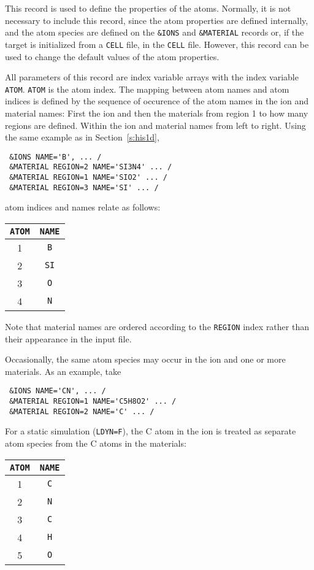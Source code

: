 This record is used to define the properties of the atoms. Normally, it is not
necessary to include this record, since the atom properties are defined
internally, and the atom species are defined on the \texttt{\&IONS} and
\texttt{\&MATERIAL} records or, if the target is initialized from a
\texttt{CELL} file, in the \texttt{CELL} file. However, this record can be used
to change the default values of the atom properties.

All parameters of this record are index variable arrays with the index variable
\texttt{ATOM}. \texttt{ATOM} is the atom index. The mapping between atom names
and atom indices is defined by the sequence of occurence of the atom names in
the ion and material names: First the ion and then the materials from region 1
to how many regions are defined. Within the ion and material names from left to
right. Using the same example as in Section~\ref{s:his1d},
%
\begin{verbatim}
 &IONS NAME='B', ... /
 &MATERIAL REGION=2 NAME='SI3N4' ... /
 &MATERIAL REGION=1 NAME='SIO2' ... /
 &MATERIAL REGION=3 NAME='SI' ... /
\end{verbatim}
%
atom indices and names relate as follows:

\begin{tabular}{cc}
  \texttt{ATOM} & \texttt{NAME} \\
  \hline
  1 & \texttt{B} \\
  2 & \texttt{SI} \\
  3 & \texttt{O} \\
  4 & \texttt{N}
\end{tabular}

Note that material names are ordered according to the \texttt{REGION} index
rather than their appearance in the input file.

Occasionally, the same atom species may occur in the ion and one or more
materials. As an example, take
%
\begin{verbatim}
 &IONS NAME='CN', ... /
 &MATERIAL REGION=1 NAME='C5H8O2' ... /
 &MATERIAL REGION=2 NAME='C' ... /
\end{verbatim}
%
For a static simulation (\texttt{LDYN=F}), the C atom in the ion is treated as
separate atom species from the C atoms in the materials:

\begin{tabular}{cc}
  \texttt{ATOM} & \texttt{NAME} \\
  \hline
  1 & \texttt{C} \\
  2 & \texttt{N} \\
  3 & \texttt{C} \\
  4 & \texttt{H} \\
  5 & \texttt{O}
\end{tabular}

